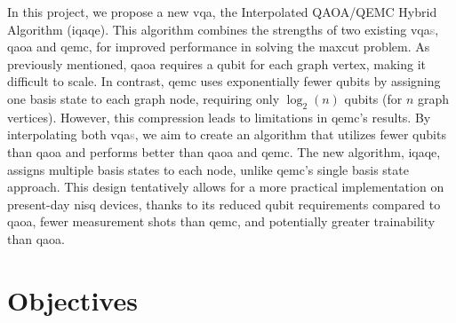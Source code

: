 

In this project, we propose a new \acrshort{vqa}, the Interpolated QAOA/QEMC Hybrid Algorithm (\acrshort{iqaqe}). This algorithm combines the strengths of two existing \acrshort{vqa}\textcolor{gray}{s}, \acrshort{qaoa} and \acrshort{qemc}, for improved performance in solving the \acrshort{maxcut} problem. As previously mentioned, \acrshort{qaoa} requires a qubit for each graph vertex, making it difficult to scale. In contrast, \acrshort{qemc} uses exponentially fewer qubits by assigning one basis state to each graph node, requiring only $\log_2(n)$ qubits (for $n$ graph vertices). However, this compression leads to limitations in \acrshort{qemc}'s results. By interpolating both \acrshort{vqa}\textcolor{gray}{s}, we aim to create an algorithm that utilizes fewer qubits than \acrshort{qaoa} and performs better than \acrshort{qaoa} and \acrshort{qemc}. The new algorithm, \acrshort{iqaqe}, assigns multiple basis states to each node, unlike \acrshort{qemc}'s single basis state approach. This design tentatively allows for a more practical implementation on present-day \acrshort{nisq} devices, thanks to its reduced qubit requirements compared to \acrshort{qaoa}, fewer measurement shots than \acrshort{qemc}, and potentially greater trainability than \acrshort{qaoa}.

\section{Objectives} %
\label{section:objectives}




